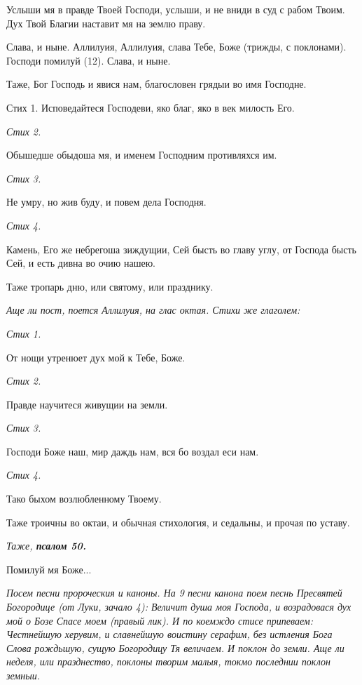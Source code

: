 Услыши мя в правде Твоей Господи, услыши, и не вниди в суд с рабом Твоим. Дух Твой Благии наставит мя на землю праву. 

Слава, и ныне. Аллилуия, Аллилуия, слава Тебе, Боже (трижды, с поклонами). Господи помилуй (12). Слава, и ныне. 

Таже, Бог Господь и явися нам, благословен грядыи во имя Господне.

Стих 1. Исповедайтеся Господеви, яко благ, яко в век милость Его.


\itshape Стих 2.\normalfont{}


Обышедше обыдоша мя, и именем Господним противляхся им.


\itshape Стих 3.\normalfont{}


Не умру, но жив буду, и повем дела Господня.


\itshape Стих 4.\normalfont{}


Камень, Его же небрегоша зиждущии, Сей бысть во главу углу, от Господа бысть Сей, и есть дивна во очию нашею. 

Таже тропарь дню, или святому, или празднику.


\itshape Аще ли пост, поется Аллилуия, на глас октая. Стихи же глаголем:\normalfont{}


\itshape Стих 1.\normalfont{}


От нощи утренюет дух мой к Тебе, Боже.


\itshape Стих 2.\normalfont{}


Правде научитеся живущии на земли.


\itshape Стих 3.\normalfont{}


Господи Боже наш, мир даждь нам, вся бо воздал еси нам.


\itshape Стих 4.\normalfont{}


Тако быхом возлюбленному Твоему.


Таже троичны во октаи, и обычная стихология, и седальны, и прочая по уставу.


\medskip


\itshape Таже, \bfseries псалом 50\normalfont{}.\normalfont{}


Помилуй мя Боже...


\itshape Посем песни пророческия и каноны. На 9 песни канона поем песнь Пресвятей Богородице (от Луки, зачало 4):\normalfont{} Величит душа моя Господа, и возрадовася дух мой о Бозе Спасе моем (правый лик). И по коемждо стисе припеваем: Честнейшую херувим, и славнейшую воистину серафим, без истления Бога Слова рождьшую, сущую Богородицу Тя величаем. И поклон до земли. Аще ли неделя, или празднество, поклоны творим малыя, токмо последнии поклон земныи.

